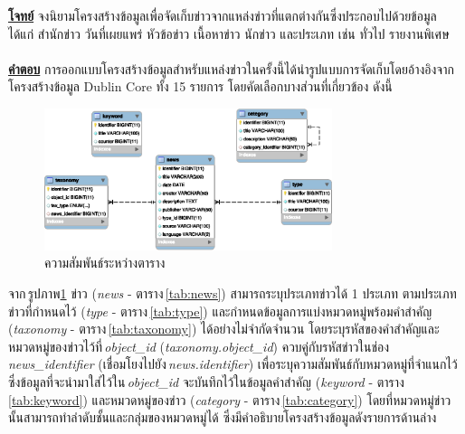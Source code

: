 \documentclass[16pt,a4paper]{article}
\renewcommand{\tablename}{ตาราง}
\renewcommand{\figurename}{รูปภาพ}
\begin{document}
\noindent
\textbf{\underline{โจทย์}} จงนิยามโครงสร้างข้อมูลเพื่อจัดเก็บข่าวจากแหล่งข่าวที่แตกต่างกันซึ่งประกอบไปด้วยข้อมูล ได้แก่ สำนักข่าว วันที่เผยแพร่ หัวข้อข่าว เนื้อหาข่าว นักข่าว และประเภท เช่น ทั่วไป รายงานพิเศษ \\ \\
\textbf{\underline{คำตอบ}} การออกแบบโครงสร้างข้อมูลสำหรับแหล่งข่าวในครั้งนี้ได้นำรูปแบบการจัดเก็บโดยอ้างอิงจากโครงสร้างข้อมูล Dublin Core \cite{dublincore} ทั้ง 15 รายการ โดยคัดเลือกบางส่วนที่เกี่ยวข้อง ดังนี้ 

\begin{figure}[!htb]
    \centering
    \includegraphics[width=0.75\textwidth]{fig/news-structure}
    \caption{ความสัมพันธ์ระหว่างตาราง}
    \label{fig:erdiagram}
\end{figure}

จาก\,\figurename \ref{fig:erdiagram} ข่าว (\textit{news} - \tablename\,\ref{tab:news}) สามารถระบุประเภทข่าวได้ 1 ประเภท ตามประเภทข่าวที่กำหนดไว้ (\textit{type} - \tablename\,\ref{tab:type}) 
และกำหนดข้อมูลการแบ่งหมวดหมู่พร้อมคำสำคัญ (\textit{taxonomy} - \tablename\,\ref{tab:taxonomy}) ได้อย่างไม่จำกัดจำนวน โดยระบุรหัสของคำสำคัญและหมวดหมู่ของข่าวไว้ที่\,\textit{object\_id} (\textit{taxonomy.object\_id}) 
ควบคู่กับรหัสข่าวในช่อง \textit{news\_identifier} (เชื่อมโยงไปยัง\,\textit{news.identifier}) เพื่อระบุความสัมพันธ์กับหมวดหมู่ที่จำแนกไว้ ซึ่งข้อมูลที่จะนำมาใส่ไว้ใน\,\textit{object\_id} จะบันทึกไว้ในข้อมูลคำสำคัญ (\textit{keyword} - \tablename\,\ref{tab:keyword}) 
และหมวดหมู่ของข่าว (\textit{category} - \tablename\,\ref{tab:category}) โดยที่หมวดหมู่ข่าวนั้นสามารถทำลำดับชั้นและกลุ่มของหมวดหมู่ได้ ซึ่งมีคำอธิบายโครงสร้างข้อมูลดังรายการด้านล่าง
\end{document}

